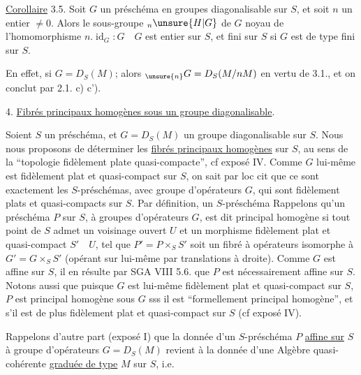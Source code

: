 \uline{Corollaire} 3.5. Soit $G$ un  préschéma en groupes diagonalisable sur $S$, et soit $n$ un entier $\ne0$. Alors le sous-groupe ${}_n\unsure{H|G}$ de $G$ noyau de l'homomorphisme $n.\operatorname{id}_G:G\quad G$ est entier sur $S$, et fini sur $S$ si $G$ est de type fini sur $S$.

En effet, si $G=D_S(M)$; alors ${}_{\unsure{n}}G=D_S(M/nM)$ en vertu de 3.1., et on conclut par 2.1. c) c').

4. \uline{Fibrés principaux homogènes sous un groupe diagonalisable}.

Soient $S$ un préschéma, et $G=D_S(M)$ un groupe diagonalisable sur $S$. Nous nous proposons de déterminer les \uline{fibrés principaux homogènes} sur $S$, au sens de la ``topologie fidèlement plate quasi-compacte'', cf exposé IV. Comme $G$ lui-même est fidèlement plat et quasi-compact sur $S$, on sait par loc cit que ce sont exactement les $S$-préschémas,  avec groupe d'opérateurs $G$, qui sont fidèlement plats et quasi-compacts sur $S$. Par définition, un $S$-préschéma Rappelons qu'un préschéma $P$ sur $S$, à groupes d'opérateurs $G$, est dit principal homogène si tout point de $S$ admet un voisinage ouvert $U$ et un morphisme fidèlement plat et quasi-compact $S'\quad U$, tel que $P'=P\times_S S'$ soit un fibré à opérateurs isomorphe à $G'=G\times_S S'$ (opérant sur lui-même par translations à droite). Comme $G$ est affine sur $S$, il en résulte par SGA VIII 5.6. que $P$ est nécessairement affine sur $S$. Notons aussi que puisque $G$ est lui-même fidèlement plat et quasi-compact sur $S$, $P$ est principal homogène sous $G$ sss il est ``formellement principal homogène'', et s'il est de plus fidèlement plat et quasi-compact sur $S$ (cf exposé IV).

Rappelons d'autre part (exposé I) que la donnée d'un $S$-préschéma $P$ \uline{affine sur} $S$ à groupe d'opérateurs $G=D_S(M)$ revient à la donnée d'une Algèbre quasi-cohérente \uline{graduée de type} $M$ sur $S$, i.e.
